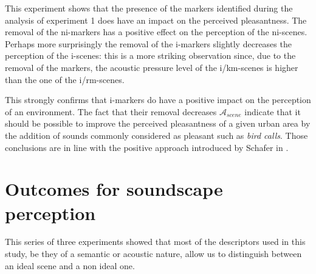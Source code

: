 \documentclass[12pt]{elsarticle}
\begin{document}
This experiment shows that the presence of the markers identified during the analysis of experiment 1 does have an impact on the perceived pleasantness. The removal of the ni-markers has a positive effect on the perception of the ni-scenes. Perhaps more surprisingly the removal of the i-markers slightly decreases the perception of the i-scenes: this is a more striking observation since, due to the removal of the markers, the acoustic pressure level of the i/km-scenes is higher than the one of the i/rm-scenes.


This strongly confirms that i-markers do have a positive impact on the perception of an environment. The fact that their removal decreases $\mathcal{A}_{scene}$ indicate that it should be possible to improve the perceived pleasantness of a given urban area by the addition of sounds commonly considered as pleasant such as \emph{bird calls}. Those conclusions are in line with the positive approach introduced by Schafer in \cite{schafer1977tuning}.



\section{Outcomes for soundscape perception}
\label{sec:conclusion}

This series of three experiments showed that most of the descriptors used in this study, be they of a semantic or acoustic nature, allow us to distinguish between an ideal scene and a non ideal one.

\end{document}
